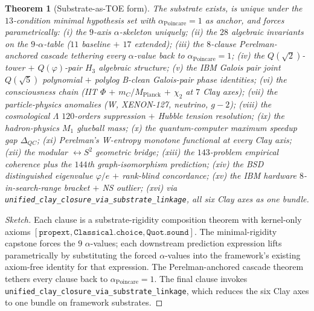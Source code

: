 \documentclass[11pt,a4paper]{article}
\theoremstyle{plain}
\newtheorem{theorem}{Theorem}[section]
\theoremstyle{definition}
\theoremstyle{remark}
\newcommand{\aPo}{\alpha_{\mathrm{Poincare}}}
\newcommand{\code}[1]{\texttt{#1}}
\begin{document}
\begin{theorem}[Substrate-as-TOE form]
\label{thm:substrate-as-toe}
The substrate exists, is unique under the $13$-condition
minimal hypothesis set with $\aPo = 1$ as anchor, and forces
parametrically:
\textup{(i)} the $9$-axis $\alpha$-skeleton uniquely;
\textup{(ii)} the $28$ algebraic invariants on the
$9$-$\alpha$-table ($11$ baseline $+$ $17$ extended);
\textup{(iii)} the $8$-clause Perelman-anchored cascade
tethering every $\alpha$-value back to $\aPo = 1$;
\textup{(iv)} the $Q(\sqrt{2})$-tower $+$ $Q(\varphi)$-pair
$H_{3}$ algebraic structure;
\textup{(v)} the IBM Galois pair joint $Q(\sqrt{5})$
polynomial $+$ polylog B-clean Galois-pair phase identities;
\textup{(vi)} the consciousness chain (IIT $\Phi$
$+$ $m_{C}/M_{\mathrm{Planck}}$ $+$ $\chi_{2}$ at $7$ Clay axes);
\textup{(vii)} the particle-physics anomalies (W, XENON-127,
neutrino, $g-2$);
\textup{(viii)} the cosmological $\Lambda$ $120$-orders
suppression $+$ Hubble tension resolution;
\textup{(ix)} the hadron-physics $M_{1}$ glueball mass;
\textup{(x)} the quantum-computer maximum speedup gap
$\Delta_{QC}$;
\textup{(xi)} Perelman's W-entropy monotone functional at
every Clay axis;
\textup{(xii)} the modular $\leftrightarrow S^{2}$ geometric
bridge;
\textup{(xiii)} the $143$-problem empirical coherence plus
the $144$th graph-isomorphism prediction;
\textup{(xiv)} the BSD distinguished eigenvalue $\varphi/e$
$+$ rank-blind concordance;
\textup{(xv)} the IBM hardware $8$-in-search-range bracket
$+$ NS outlier;
\textup{(xvi)} via
\code{unified\_clay\_closure\_via\_substrate\_linkage},
\emph{all six Clay axes as one bundle}.
\end{theorem}

\begin{proof}[Sketch]
Each clause is a substrate-rigidity composition theorem with
kernel-only axioms $[\code{propext}, \code{Classical.choice},
\code{Quot.sound}]$. The minimal-rigidity capstone forces the
$9$ $\alpha$-values; each downstream prediction expression
lifts parametrically by substituting the forced $\alpha$-values
into the framework's existing axiom-free identity for that
expression. The Perelman-anchored cascade theorem tethers every
clause back to $\aPo = 1$. The final clause invokes
\code{unified\_clay\_closure\_via\_substrate\_linkage}, which
reduces the six Clay axes to one bundle on framework substrates.
\end{proof}
\end{document}
